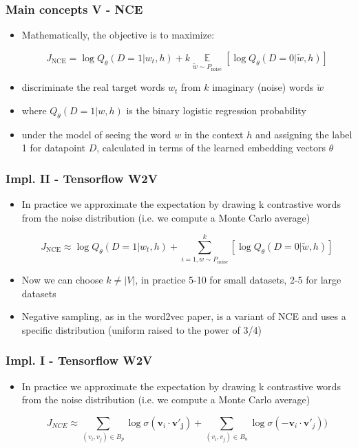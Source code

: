 \documentclass{beamer}
\begin{document}
\begin{frame}
  \frametitle{Main concepts V - NCE}
  
  \begin{itemize}
\item Mathematically, the objective is to maximize:

$$J_\text{NCE} = \log Q_\theta(D=1 |w_t, h) + k \mathop{\mathbb{E}}\limits_{\tilde w \sim P_\text{noise}} \left[ \log Q_\theta(D = 0 |\tilde w, h) \right]$$

\item discriminate the real target words \(w_t\) from \(k\) imaginary (noise) words \(\tilde w\)
\item where $Q_\theta(D=1 | w, h)$ is the binary logistic regression probability
\item under the model of seeing the word $w$ in the context $h$ and assigning the label 1 for datapoint $D$, calculated in terms of the learned embedding vectors $\theta$

\end{itemize}
\end{frame} 

\begin{frame}
  \frametitle{Impl. II - Tensorflow W2V}
    \begin{itemize}
    	\item In practice we approximate the expectation by drawing k contrastive words from the noise distribution (i.e. we compute a Monte Carlo average) 
       
   
   $$J_\text{NCE} \approx \log Q_\theta(D=1 |w_t, h) +  \sum_{i=1, w \sim P_\text{noise}}^{k}  \left[ \log Q_\theta(D = 0 |\tilde w, h) \right]$$ 
   \item Now we can choose $k \neq |V|$, in practice 5-10 for small datasets, 2-5 for large datasets
   \item Negative sampling, as in the word2vec paper, is a variant of NCE and uses a specific distribution (uniform raised to the power of 3/4)
   
 \end{itemize}
\end{frame} 




\begin{frame}
  \frametitle{Impl. I - Tensorflow W2V}
    \begin{itemize}
    	\item In practice we approximate the expectation by drawing k contrastive words from the noise distribution (i.e. we compute a Monte Carlo average) 
       
   
   $$J_{NCE} \approx  \sum_{ (v_i, v_j) \in B_p } \log \sigma{( \mathbf{v}_i \cdot \mathbf{v'_j}  )  } + \sum_{ (v_i, v_j) \in B_n } \log \sigma{(   \mathbf{-v}_i \cdot \mathbf{{v}'}_j   )}\Big)$$
    
 \end{itemize}
\end{frame} 
\end{document}
